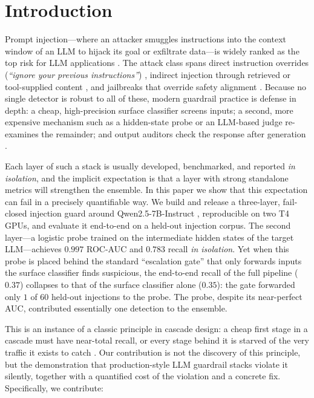 \documentclass[conference]{IEEEtran}
\begin{document}
\section{Introduction}
\label{sec:intro}

Prompt injection---where an attacker smuggles instructions into the context
window of an LLM to hijack its goal or exfiltrate data---is widely ranked as
the top risk for LLM applications \cite{liu2024}. The attack class spans direct
instruction overrides (\emph{``ignore your previous instructions''})
\cite{perez2022}, indirect injection through retrieved or tool-supplied content
\cite{greshake2023,liu2024}, and jailbreaks that override safety alignment
\cite{zou2023}. Because no single detector is robust to all of these, modern
guardrail practice is defense in depth: a cheap, high-precision surface
classifier screens inputs; a second, more expensive mechanism such as a
hidden-state probe or an LLM-based judge re-examines the remainder; and output
auditors check the response after generation
\cite{inan2023,li2025,injecguard,instructdetector,jbshield}.

Each layer of such a stack is usually developed, benchmarked, and reported
\emph{in isolation}, and the implicit expectation is that a layer with strong
standalone metrics will strengthen the ensemble. In this paper we show that
this expectation can fail in a precisely quantifiable way. We build and release
a three-layer, fail-closed injection guard around Qwen2.5-7B-Instruct
\cite{qwen25}, reproducible on two T4 GPUs, and evaluate it end-to-end on a
held-out injection corpus. The second layer---a logistic probe trained on the
intermediate hidden states of the target LLM---achieves $0.997$ ROC-AUC and
$0.783$ recall \emph{in isolation}. Yet when this probe is placed behind the
standard ``escalation gate'' that only forwards inputs the surface classifier
finds suspicious, the end-to-end recall of the full pipeline ($0.37$) collapses
to that of the surface classifier alone ($0.35$): the gate forwarded only $1$
of $60$ held-out injections to the probe. The probe, despite its near-perfect
AUC, contributed essentially one detection to the ensemble.

This is an instance of a classic principle in cascade design: a cheap first
stage in a cascade must have near-total recall, or every stage behind it is
starved of the very traffic it exists to catch \cite{viola2001}. Our
contribution is not the discovery of this principle, but the demonstration that
production-style LLM guardrail stacks violate it silently, together with a
quantified cost of the violation and a concrete fix. Specifically, we
contribute:
\end{document}
